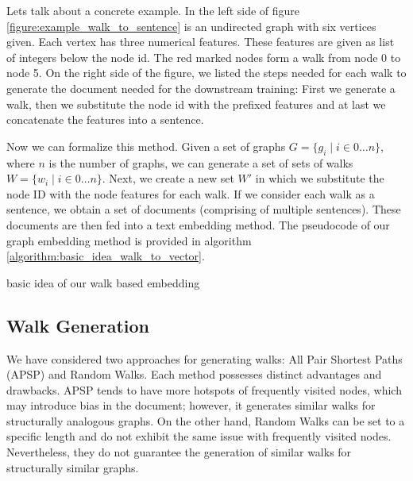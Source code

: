 Lets talk about a concrete example. In the left side of figure \ref{figure:example_walk_to_sentence} is an undirected graph with six vertices given. Each vertex has three numerical features. These features are given as list of integers below the node id. The red marked nodes form a walk from node 0 to node 5. On the right side of the figure, we listed the steps needed for each walk to generate the document needed for the downstream training: First we generate a walk, then we substitute the node id with the prefixed features and at last we concatenate the features into a sentence.

Now we can formalize this method. Given a set of graphs $G = \{ g_i \mid i \in 0 \dots n \}$, where $n$ is the number of graphs, we can generate a set of sets of walks $W = \{ w_i \mid i \in 0 \dots n \}$. Next, we create a new set $W'$ in which we substitute the node ID with the node features for each walk. If we consider each walk as a sentence, we obtain a set of documents (comprising of multiple sentences). These documents are then fed into a text embedding method. The pseudocode of our graph embedding method is provided in algorithm \ref{algorithm:basic_idea_walk_to_vector}.

\begin{minipage}{\linewidth}
    \begin{algorithm}[H]
        \DontPrintSemicolon



        \caption{basic idea of our walk based embedding}
        \label{algorithm:basic_idea_walk_to_vector}
    \end{algorithm}
\end{minipage}


\subsection{Walk Generation}
We have considered two approaches for generating walks: All Pair Shortest Paths (APSP) and Random Walks. Each method possesses distinct advantages and drawbacks. APSP tends to have more hotspots of frequently visited nodes, which may introduce bias in the document; however, it generates similar walks for structurally analogous graphs. On the other hand, Random Walks can be set to a specific length and do not exhibit the same issue with frequently visited nodes. Nevertheless, they do not guarantee the generation of similar walks for structurally similar graphs.

